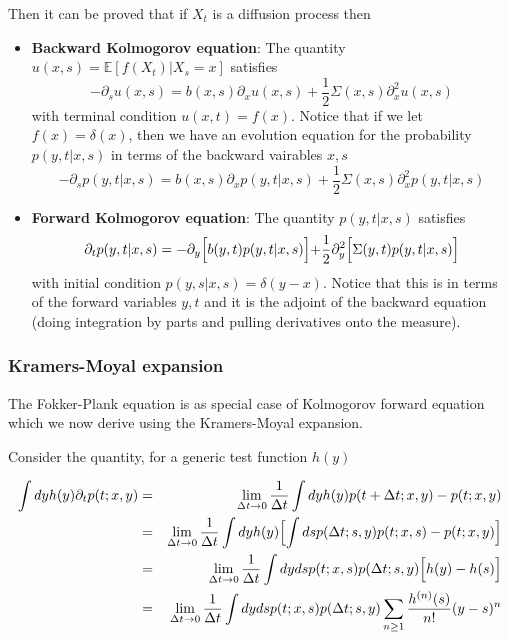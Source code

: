 \documentclass[11pt,a4paper]{article}
\begin{document}
Then it can be proved that if $X_t$ is a diffusion process then

\begin{itemize}
    \item \textbf{Backward Kolmogorov equation}: The quantity $u(x,s) = \mathbb{E}[f(X_t)|X_s = x]$ satisfies 
    \begin{equation}
    -\partial_s u(x,s) = b(x,s)\partial_xu(x,s) + \frac{1}{2}\Sigma(x,s) \partial^2_xu(x,s)  
    \end{equation}
    with terminal condition $u(x,t) = f(x)$. Notice that if we let $f(x) = \delta(x)$, then we have an evolution equation for the probability $p(y,t|x,s)$ in terms of the backward vairables $x,s$
    \begin{equation}
        -\partial_s p(y,t|x,s)= b(x,s)\partial_xp(y,t|x,s) + \frac{1}{2}\Sigma(x,s) \partial^2_xp(y,t|x,s) 
        \end{equation}

\end{itemize}

\begin{itemize}
    \item \textbf{Forward Kolmogorov equation}: The quantity $p(y,t|x,s)$ satisfies 
    \begin{equation}
    \partial_t p(y,t|x,s) = -\partial_y\Bigl[b(y,t)p(y,t|x,s)\Bigl] + \frac{1}{2} \partial^2_y\Bigl[\Sigma(y,t)p(y,t|x,s)\Bigl]  
    \end{equation}
    with initial condition $p(y,s|x,s) = \delta(y-x)$. Notice that this is in terms of the forward variables $y,t$ and it is the adjoint of the backward equation (doing integration by parts and pulling derivatives onto the measure).
\end{itemize}

\subsubsection{Kramers-Moyal expansion}
The Fokker-Plank equation is as special case of Kolmogorov forward equation which we now derive using the Kramers-Moyal expansion.

Consider the quantity, for a generic test function $h(y)$

\begin{eqnarray*}
    \int dyh(y)\partial_t p(t;x,y) &=& \lim_{\Delta t \to 0}\frac{1}{\Delta t}\int dyh(y)p(t+\Delta t;x,y)-p(t;x,y) \\
    &=&  \lim_{\Delta t \to 0}\frac{1}{\Delta t}\int dyh(y)\Bigl[\int dsp(\Delta t;s,y)p(t; x,s)-p(t;x,y)\Bigl] \\
    &=& \lim_{\Delta t \to 0}\frac{1}{\Delta t}\int dyds p(t;x,s)p(\Delta t;s,y)\Bigl[h(y)-h(s)\Bigl] \\
    &=& \lim_{\Delta t \to 0}\frac{1}{\Delta t}\int dyds p(t;x,s)p(\Delta t;s,y)\sum_{n\geq 1}\frac{h^{(n)}(s)}{n!}(y-s)^n
\end{eqnarray*}
\end{document}
